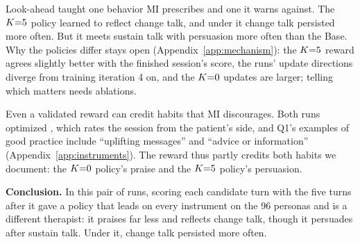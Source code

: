 Look-ahead taught one behavior MI prescribes and one it warns against. The $K{=}5$ policy
learned to reflect change talk, and under it change talk persisted more often. But it meets
sustain talk with persuasion more often than the Base. Why the policies differ stays open
(Appendix~\ref{app:mechanism}): the $K{=}5$ reward agrees slightly better with the finished
session's score, the runs' update directions diverge from training iteration 4 on, and the
$K{=}0$ updates are larger; telling which matters needs ablations.

Even a validated reward can credit habits that MI discourages. Both runs optimized \QQ, which
rates the session from the patient's side, and Q1's examples of good practice include ``uplifting
messages'' and ``advice or information'' (Appendix~\ref{app:instruments}). The reward thus partly
credits both habits we document: the $K{=}0$ policy's praise and the $K{=}5$ policy's persuasion.

\textbf{Conclusion.}
In this pair of runs, scoring each candidate turn with the five turns after it gave a policy that
leads on every instrument on the 96 personas and is a different therapist: it praises far less and
reflects change talk, though it persuades after sustain talk. Under it, change talk persisted more
often.
